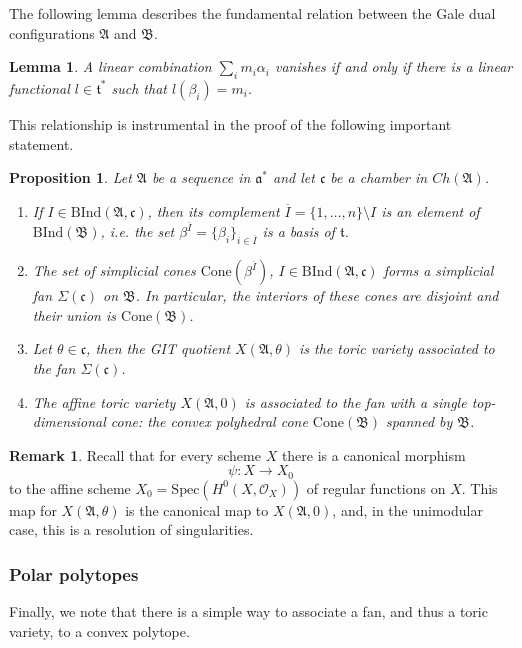 \documentclass[11pt]{article}
\newtheorem{lemma}[theo]{Lemma}
\newtheorem{prop}[theo]{Proposition}
\theoremstyle{definition}
\newtheorem{rema}[theo]{Remark}
\numberwithin{equation}{section}
\newcommand{\cone}{\mathrm{Cone}}
\newcommand{\A}{\mathfrak{A}}
\newcommand{\B}{\mathfrak{B}}
\begin{document}
The following lemma describes the fundamental relation between the Gale dual configurations $\A$ and $\B$. 
\begin{lemma}\label{Galebas}
A linear combination $\sum_i m_i\alpha_i$ vanishes if and only if there is a linear functional $l\in\mathfrak{t}^*$ such that $l(\beta_i)=m_i$.
\end{lemma}
This relationship is instrumental in the proof of the following important statement.
\begin{prop}\label{fanforGIT}
Let $\A$ be a sequence in $\mathfrak{a}^*$ and let $\mathfrak{c}$ be a chamber in $Ch(\A)$. 
\begin{enumerate}%
\item 
 If $I\in \mathrm{BInd}(\A, \mathfrak{c})$, then its complement 
 $\overline{I}=\{1, \ldots ,n\}\setminus I$ is an element of $\mathrm{BInd}(\B)$, 
 i.e.  the set $\beta^{\overline{I}}=\{\beta_i\}_{i\in\overline{I}}$ is a basis 
 of $\mathfrak{t}$.
 \item The set of simplicial cones $\cone(\beta^{\overline{I}})$, $I\in 
 \mathrm{BInd}(\A, \mathfrak{c})$ forms a simplicial fan  
 $\Sigma(\mathfrak{c})$  on $\B$. In particular, the interiors of these cones 
 are disjoint and their union is $ \cone(\B) $. 
\item  Let $\theta\in \mathfrak{c}$, then the GIT quotient $X(\A,\theta)$ is the toric variety associated to the fan $\Sigma(\mathfrak{c})$.
\item The affine toric variety $X(\A,0)$ is associated to the fan with a single top-dimensional cone: 
 the convex polyhedral cone $\cone({\B})$ spanned by $\B$.
\end{enumerate}
\end{prop}



\begin{rema}\label{canonocalmor} Recall that for every scheme $X$ there 
is a canonical morphism
$$\psi: X\to X_0$$ 
to the affine scheme $X_0 = \mathrm{Spec}(H^0(X,\mathcal{O}_X))$ of regular 
functions on $X$. This map for $X(\A,\theta)$ is the canonical map to 
$X(\A,0)$, and, in the unimodular case, this is a resolution of singularities.
\end{rema}


\subsubsection{Polar polytopes}\label{S2.3}


Finally, we note that there is a simple way to associate a fan, and thus a  
toric variety, to a convex polytope. 
\end{document}
